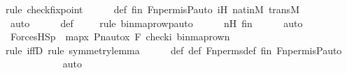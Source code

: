 \begin{isabellebody}
{\isacharparenleft}{\kern0pt}rule\ check{\isacharunderscore}{\kern0pt}fixpoint{\isacharparenright}{\kern0pt}\isanewline
\ \ \ \ \isamarkupfalse%
\ {\isasympi}{\isacharunderscore}{\kern0pt}def\ fin\ Fn{\isacharunderscore}{\kern0pt}perm{\isacharprime}{\kern0pt}{\isacharunderscore}{\kern0pt}is{\isacharunderscore}{\kern0pt}P{\isacharunderscore}{\kern0pt}auto\ iH\ nat{\isacharunderscore}{\kern0pt}in{\isacharunderscore}{\kern0pt}M\ transM\isanewline
\ \ \ \ \ \ \isamarkupfalse%
\ auto{\isacharbrackleft}{\kern0pt}{}{\isacharbrackright}{\kern0pt}\isanewline
\ \ \ \ \isamarkupfalse%
\ {\isasympi}{\isacharunderscore}{\kern0pt}def\isanewline
\ \ \ \ \isamarkupfalse%
{\isacharparenleft}{\kern0pt}rule\ binmap{\isacharunderscore}{\kern0pt}row{\isacharprime}{\kern0pt}{\isacharunderscore}{\kern0pt}pauto{\isacharparenright}{\kern0pt}\isanewline
\ \ \ \ \isamarkupfalse%
\ nH\ fin\isanewline
\ \ \ \ \isamarkupfalse%
\ auto\isanewline
\isanewline
\ \ \isamarkupfalse%
\ {\isachardoublequoteopen}ForcesHS{\isacharparenleft}{\kern0pt}{\isasympi}{\isacharbackquote}{\kern0pt}p{\isacharcomma}{\kern0pt}\ {\isasymphi}{\isacharcomma}{\kern0pt}\ map{\isacharparenleft}{\kern0pt}{\isasymlambda}x{\isachardot}{\kern0pt}\ Pn{\isacharunderscore}{\kern0pt}auto{\isacharparenleft}{\kern0pt}{\isasympi}{\isacharparenright}{\kern0pt}{\isacharbackquote}{\kern0pt}x{\isacharcomma}{\kern0pt}\ {\isacharbrackleft}{\kern0pt}F{\isacharprime}{\kern0pt}{\isacharcomma}{\kern0pt}\ check{\isacharparenleft}{\kern0pt}i{\isacharparenright}{\kern0pt}{\isacharcomma}{\kern0pt}\ binmap{\isacharunderscore}{\kern0pt}row{\isacharprime}{\kern0pt}{\isacharparenleft}{\kern0pt}n{\isacharparenright}{\kern0pt}{\isacharbrackright}{\kern0pt}{\isacharparenright}{\kern0pt}{\isacharparenright}{\kern0pt}{\isachardoublequoteclose}\ \isanewline
\ \ \ \ \isamarkupfalse%
{\isacharparenleft}{\kern0pt}rule\ iffD{}{\isacharcomma}{\kern0pt}\ rule\ symmetry{\isacharunderscore}{\kern0pt}lemma{\isacharparenright}{\kern0pt}\isanewline
\ \ \ \ \isamarkupfalse%
\ {\isasymphi}{\isacharunderscore}{\kern0pt}def\ {\isasympi}{\isacharunderscore}{\kern0pt}def\ Fn{\isacharunderscore}{\kern0pt}perms{\isacharunderscore}{\kern0pt}def\ fin\ Fn{\isacharunderscore}{\kern0pt}perm{\isacharprime}{\kern0pt}{\isacharunderscore}{\kern0pt}is{\isacharunderscore}{\kern0pt}P{\isacharunderscore}{\kern0pt}auto\ \isanewline
\ \ \ \ \ \ \ \ \ \ \isamarkupfalse%
\ auto{\isacharbrackleft}{\kern0pt}{}{\isacharbrackright}{\kern0pt}\isanewline

\end{isabellebody}
